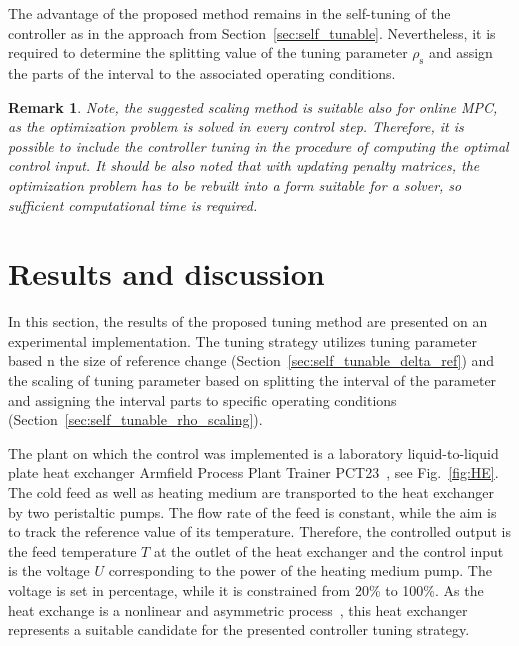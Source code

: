 \documentclass[preprint,12pt]{elsarticle}
\newtheorem{remark}[theorem]{Remark}
\begin{document}
The advantage of the proposed method remains in the self-tuning of the controller as in the approach from Section~\ref{sec:self_tunable}. Nevertheless, it is required to determine the splitting value of the tuning parameter $\rho_{\mathrm{s}}$ and assign the parts of the interval to the associated operating conditions.

\begin{remark}
	Note, the suggested scaling method is suitable also for online MPC, as the optimization problem is solved in every control step. Therefore, it is possible to include the controller tuning in the procedure of computing the optimal control input. It should be also noted that with updating penalty matrices, the optimization problem has to be rebuilt into a form suitable for a solver, so sufficient computational time is required.  
\end{remark}

\section{Results and discussion}
\label{sec:results}

In this section, the results of the proposed tuning method are presented on an experimental implementation. The tuning strategy utilizes tuning parameter based n the size of reference change (Section~\ref{sec:self_tunable_delta_ref}) and the scaling of tuning parameter based on splitting the interval of the parameter and assigning the interval parts to specific operating conditions (Section~\ref{sec:self_tunable_rho_scaling}).

The plant on which the control was implemented is a laboratory liquid-to-liquid plate heat exchanger Armfield Process Plant Trainer PCT23~\cite{pct23}, see Fig.~\ref{fig:HE}. The cold feed as well as heating medium are transported to the heat exchanger by two peristaltic pumps. The flow rate of the feed is constant, while the aim is to track the reference value of its temperature. Therefore, the controlled output is the feed temperature $T$ at the outlet of the heat exchanger and the control input is the voltage $U$ corresponding to the power of the heating medium pump. The voltage is set in percentage, while it is constrained from 20\% to 100\%. As the heat exchange is a nonlinear and asymmetric process~\cite{Liptak}, this heat exchanger represents a suitable candidate for the presented controller tuning strategy.  
\end{document}
